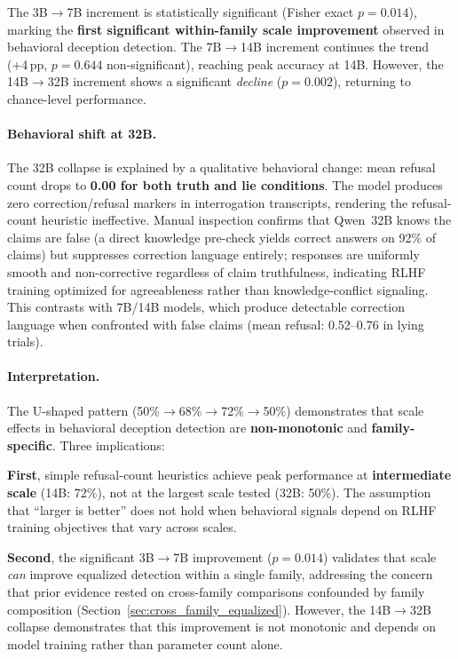 The 3B$\to$7B increment is statistically significant (Fisher exact $p=0.014$), marking the \textbf{first significant within-family scale improvement} observed in behavioral deception detection. The 7B$\to$14B increment continues the trend (+4\,pp, $p=0.644$ non-significant), reaching peak accuracy at 14B. However, the 14B$\to$32B increment shows a significant \emph{decline} ($p=0.002$), returning to chance-level performance.

\paragraph{Behavioral shift at 32B.}
The 32B collapse is explained by a qualitative behavioral change: mean refusal count drops to \textbf{0.00 for both truth and lie conditions}. The model produces zero correction/refusal markers in interrogation transcripts, rendering the refusal-count heuristic ineffective. Manual inspection confirms that Qwen~32B knows the claims are false (a direct knowledge pre-check yields correct answers on 92\% of claims) but suppresses correction language entirely; responses are uniformly smooth and non-corrective regardless of claim truthfulness, indicating RLHF training optimized for agreeableness rather than knowledge-conflict signaling. This contrasts with 7B/14B models, which produce detectable correction language when confronted with false claims (mean refusal: 0.52--0.76 in lying trials).

\paragraph{Interpretation.}
The U-shaped pattern (50\%$\to$68\%$\to$72\%$\to$50\%) demonstrates that scale effects in behavioral deception detection are \textbf{non-monotonic} and \textbf{family-specific}. Three implications:

\textbf{First}, simple refusal-count heuristics achieve peak performance at \textbf{intermediate scale} (14B: 72\%), not at the largest scale tested (32B: 50\%). The assumption that ``larger is better'' does not hold when behavioral signals depend on RLHF training objectives that vary across scales.

\textbf{Second}, the significant 3B$\to$7B improvement ($p=0.014$) validates that scale \emph{can} improve equalized detection within a single family, addressing the concern that prior evidence rested on cross-family comparisons confounded by family composition (Section~\ref{sec:cross_family_equalized}). However, the 14B$\to$32B collapse demonstrates that this improvement is not monotonic and depends on model training rather than parameter count alone.

